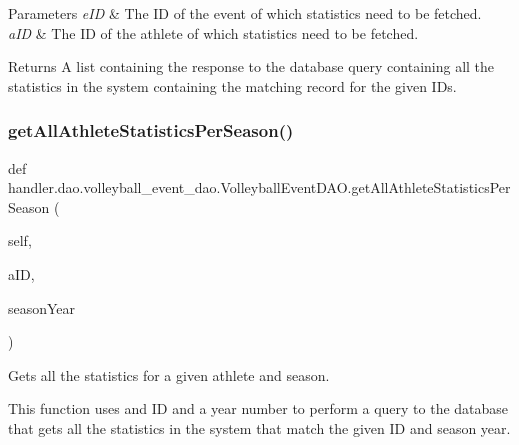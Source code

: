 \begin{DoxyParams}{Parameters}
{\em e\+ID} & The ID of the event of which statistics need to be fetched. \\
\hline
{\em a\+ID} & The ID of the athlete of which statistics need to be fetched.\\
\hline
\end{DoxyParams}
\begin{DoxyReturn}{Returns}
A list containing the response to the database query containing all the statistics in the system containing the matching record for the given I\+Ds. 
\end{DoxyReturn}
\mbox{\label{classhandler_1_1dao_1_1volleyball__event__dao_1_1_volleyball_event_d_a_o_a07e2fadc0c0308559a511fee558b2b2c}} 
\subsubsection{\texorpdfstring{get\+All\+Athlete\+Statistics\+Per\+Season()}{getAllAthleteStatisticsPerSeason()}}
{\footnotesize\ttfamily def handler.\+dao.\+volleyball\+\_\+event\+\_\+dao.\+Volleyball\+Event\+D\+A\+O.\+get\+All\+Athlete\+Statistics\+Per\+Season (\begin{DoxyParamCaption}\item[{}]{self,  }\item[{}]{a\+ID,  }\item[{}]{season\+Year }\end{DoxyParamCaption})}



Gets all the statistics for a given athlete and season. 

This function uses and ID and a year number to perform a query to the database that gets all the statistics in the system that match the given ID and season year.



